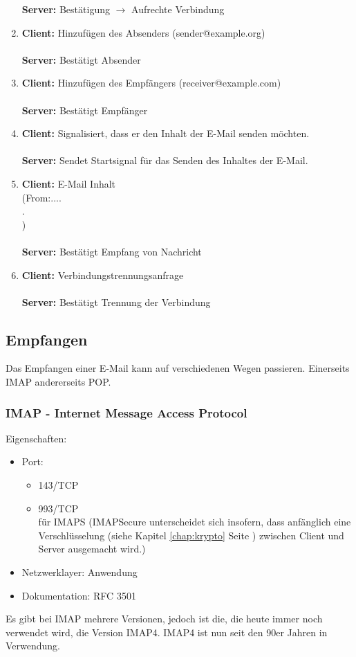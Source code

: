 \documentclass[12pt,a4paper]{report}
\begin{document}
\begin{onehalfspace}
\begin{enumerate}
\textbf{Server:} Bestätigung $\rightarrow$ Aufrechte Verbindung
\item \textbf{Client:} Hinzufügen des Absenders (sender@example.org)\\\\
\textbf{Server:} Bestätigt Absender
\item \textbf{Client:} Hinzufügen des Empfängers (receiver@example.com)\\\\
\textbf{Server:} Bestätigt Empfänger
\item \textbf{Client:} Signalisiert, dass er den Inhalt der E-Mail senden möchten.\\\\
\textbf{Server:} Sendet Startsignal für das Senden des Inhaltes der E-Mail.
\item \textbf{Client:} E-Mail Inhalt \\
(From:....\\
.\\
)\\\\
\textbf{Server:} Bestätigt Empfang von Nachricht
\item \textbf{Client:} Verbindungstrennungsanfrage\\\\
\textbf{Server:} Bestätigt Trennung der Verbindung
\end{enumerate}
\subsection{Empfangen}
Das Empfangen einer E-Mail kann auf verschiedenen Wegen passieren. Einerseits IMAP andererseits POP.
\subsubsection{IMAP - Internet Message Access Protocol}
Eigenschaften:\\
\begin{itemize}
\item Port:
\begin{itemize}
\item 143/TCP
\item 993/TCP\\
für IMAPS (IMAPSecure unterscheidet sich insofern, dass anfänglich eine Verschlüsselung (siehe Kapitel \ref{chap:krypto} Seite \pageref{chap:krypto}) zwischen Client und Server ausgemacht wird.)

\end{itemize}
\item Netzwerklayer: Anwendung
\item Dokumentation: RFC 3501
\end{itemize}
Es gibt bei IMAP mehrere Versionen, jedoch ist die, die heute immer noch verwendet wird, die Version IMAP4. IMAP4 ist nun seit den 90er Jahren in Verwendung.

\end{onehalfspace}
\end{document}
